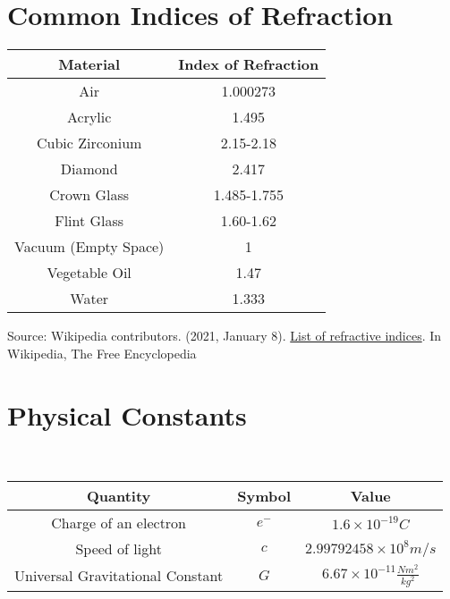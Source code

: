 \section{Common Indices of Refraction}
\begin{center}



	\begin{table}[h]
	\caption{\label{tab:refraction}Table of Common Indices of Refraction}
	
	\begin{longtable}{|c |c|}
		\hline
		\textbf{Material} & \textbf{Index of Refraction} \\
		\hline
		Air & 1.000273 \\
		\hline
		Acrylic & 1.495 \\
		\hline
		Cubic Zirconium & 2.15-2.18\\
		\hline
		Diamond & 2.417 \\
		\hline
		Crown Glass & 1.485-1.755\\
		\hline
		Flint Glass & 1.60-1.62 \\
		\hline
		Vacuum (Empty Space) & 1 \\
		\hline
		Vegetable Oil &1.47 \\
		\hline
		Water & 1.333 \\		
		\hline

	\end{longtable}


\end{table}
\end{center}
Source: Wikipedia contributors. (2021, January 8). \href{https://en.wikipedia.org/wiki/List_of_refractive_indices}{List of refractive indices}. In Wikipedia, The Free Encyclopedia


\newpage






\section{Physical Constants}

\
\begin{table}[h]
	\caption{\label{tab:Constants}Table of Common Physical Constants}
	
	\begin{longtable}{|c |c| c |}
		\hline
		Quantity & Symbol & Value \\
		\hline
		Charge of an electron & $e^-$ & $1.6 \times 10^{-19}\si{C}$ \\
		\hline
		Speed of light & $c$ & $2.99792458 \times 10^8 \si{m/s}$ \\
		\hline
		Universal Gravitational Constant &  $G$ & $6.67 \times 10^{-11} \si{\frac{Nm^2}{kg^2}}$ \\
		\hline
	
	\end{longtable}
\end{table}
